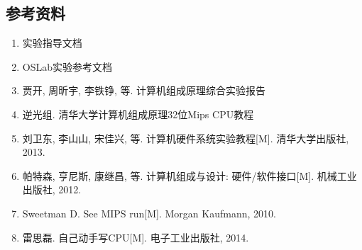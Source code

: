\subsection{参考资料}

\begin{enumerate}
	
	\item 实验指导文档
	
	\item OSLab实验参考文档
	
	\item 贾开, 周昕宇, 李铁铮, 等. 计算机组成原理综合实验报告
	
	\item 逆光组. 清华大学计算机组成原理32位Mips CPU教程
	
	\item 刘卫东, 李山山, 宋佳兴, 等. 计算机硬件系统实验教程[M]. 清华大学出版社, 2013.
	
	\item 帕特森, 亨尼斯, 康继昌, 等. 计算机组成与设计: 硬件/软件接口[M]. 机械工业出版社, 2012.
	
	\item Sweetman D. See MIPS run[M]. Morgan Kaufmann, 2010.
	
	\item 雷思磊. 自己动手写CPU[M]. 电子工业出版社, 2014.
	
\end{enumerate}